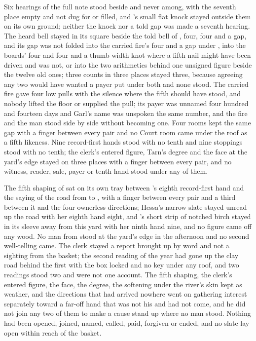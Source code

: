Six hearings of the full note stood beside and never among, with the seventh place empty and not dug for or filled, and 's small flat knock stayed outside them on its own ground; neither the knock nor a told gap was made a seventh hearing. The heard bell stayed in its square beside the told bell of , four, four and a gap, and its gap was not folded into the carried fire's four and a gap under , into the boards' four and four and a thumb-width knot where a fifth nail might have been driven and was not, or into the two arithmetics behind one unsigned figure beside the twelve old ones; three counts in three places stayed three, because agreeing any two would have wanted a payer put under both and none stood. The carried fire gave four low pulls with the silence where the fifth should have stood, and nobody lifted the floor or supplied the pull; its payer was unnamed four hundred and fourteen days and Garl's name was unspoken the same number, and the fire and the man stood side by side without becoming one. Four rooms kept the same gap with a finger between every pair and no Court room came under the roof as a fifth likeness. Nine record-first hands stood with no tenth and nine stoppings stood with no tenth; the clerk's entered figure, Tarn's degree and the face at the yard's edge stayed on three places with a finger between every pair, and no witness, reader, sale, payer or tenth hand stood under any of them.

The fifth shaping of  sat on its own tray between 's eighth record-first hand and the saying of the road from  to , with a finger between every pair and a third between it and the four ownerless directions; Hessa's narrow slate stayed unread up the road with her eighth hand eight, and 's short strip of notched birch stayed in its sleeve away from this yard with her ninth hand nine, and no figure came off any wood. No man from  stood at the yard's edge in the afternoon and no second well-telling came. The clerk stayed a report brought up by word and not a sighting from the basket; the second reading of the year had gone up the clay road behind the first with the box locked and no key under any roof, and two readings stood two and were not one account. The fifth shaping, the clerk's entered figure, the face, the degree, the softening under the river's skin kept as weather, and the directions that had arrived nowhere went on gathering interest separately toward a far-off hand that was not his and had not come, and he did not join any two of them to make a cause stand up where no man stood. Nothing had been opened, joined, named, called, paid, forgiven or ended, and no slate lay open within reach of the basket.

